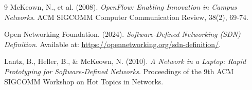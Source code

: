 \documentclass[12pt,a4paper]{article}
\begin{document}
\newpage
\begin{thebibliography}{9}
McKeown, N., et al. (2008). \textit{OpenFlow: Enabling Innovation in Campus Networks}. ACM SIGCOMM Computer Communication Review, 38(2), 69-74.

Open Networking Foundation. (2024). \textit{Software-Defined Networking (SDN) Definition}. Available at: \url{https://opennetworking.org/sdn-definition/}.

Lantz, B., Heller, B., \& McKeown, N. (2010). \textit{A Network in a Laptop: Rapid Prototyping for Software-Defined Networks}. Proceedings of the 9th ACM SIGCOMM Workshop on Hot Topics in Networks.
\end{thebibliography}
\end{document}

